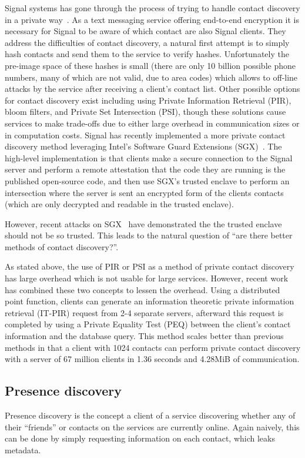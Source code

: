 Signal systems has gone through the process of trying to handle contact
discovery in a private way~\cite{marlinspike_2014}. As a text messaging service
offering end-to-end encryption it is necessary for Signal to be aware of which
contact are also Signal clients. They address the difficulties of contact
discovery, a natural first attempt is to simply hash contacts and send them to
the service to verify hashes. Unfortunately the pre-image space of these hashes
is small (there are only 10 billion possible phone numbers, many of which are
not valid, due to area codes) which allows to off-line attacks by the service
after receiving a client's contact list. Other possible options for contact
discovery exist including using Private Information Retrieval (PIR), bloom
filters, and Private Set Intersection (PSI), though these solutions cause
services to make trade-offs due to either large overhead in communication sizes
or in computation costs. Signal has recently implemented a more private contact
discovery method leveraging Intel's Software Guard Extensions
(SGX)~\cite{marlinspike_2017}. The high-level implementation is that clients
make a secure connection to the Signal server and perform a remote attestation
that the code they are running is the published open-source code, and then use
SGX's trusted enclave to perform an intersection where the server is sent an
encrypted form of the clients contacts (which are only decrypted and readable in
the trusted enclave). 

However, recent attacks on SGX~\cite{van2018foreshadow} have demonstrated the
the trusted enclave should not be so trusted. This leads to the natural question
of ``are there better methods of contact discovery?''. 

As stated above, the use of PIR or PSI as a method of private contact discovery
has large overhead which is not usable for large services. However, recent
work~\cite{demmler2018pir} has combined these two concepts to lessen the
overhead. Using a distributed point function, clients can generate an
information theoretic private information retrieval (IT-PIR) request from 2-4
separate servers, afterward this request is completed by using a Private
Equality Test (PEQ) between the client's contact information and the database
query. This method scales better than previous methods in that a client with
1024 contacts can perform private contact discovery with a server of 67 million
clients in 1.36 seconds and 4.28MiB of communication.

\subsection{Presence discovery}
Presence discovery is the concept a client of a service discovering whether any
of their ``friends'' or contacts on the services are currently online. Again
naively, this can be done by simply requesting information on each contact,
which leaks metadata.

